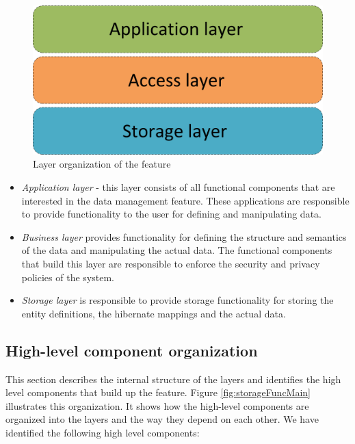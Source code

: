 \begin{figure}[h!]
  \centering
  	\includegraphics[scale=0.4]{storage/functional/layers.png}
  \caption{Layer organization of the feature}
  \label{fig:storageLayers}
\end{figure}

\begin{itemize}
	\item \textit{Application layer} - this layer consists of all functional components that are interested in the data management feature. These applications are responsible to provide functionality to the user for defining and manipulating data.
	
	\item \textit{Business layer} provides functionality for defining the structure and semantics of the data and manipulating the actual data. The functional components that build this layer are responsible to enforce the security and privacy policies of the system.
	
	\item \textit{Storage layer } is responsible to provide storage functionality for storing the entity definitions, the hibernate mappings and the actual data.
\end{itemize}

\subsection{High-level component organization}
This section describes the internal structure of the layers and identifies the high level components that build up the feature. Figure \ref{fig:storageFuncMain} illustrates this organization. It shows how the high-level components are organized into the layers and the way they depend on each other. We have identified the following high level components:

